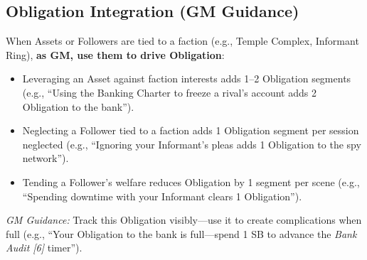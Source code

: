 \subsection{Obligation Integration (GM Guidance)}
\label{sec:obligation-integration}
When Assets or Followers are tied to a faction (e.g., Temple Complex, Informant Ring), \textbf{as GM, use them to drive Obligation}:  
\begin{itemize}
  \item Leveraging an Asset against faction interests adds 1--2 Obligation segments (e.g., ``Using the Banking Charter to freeze a rival's account adds 2 Obligation to the bank'').  
  \item Neglecting a Follower tied to a faction adds 1 Obligation segment per session neglected (e.g., ``Ignoring your Informant's pleas adds 1 Obligation to the spy network'').  
  \item Tending a Follower's welfare reduces Obligation by 1 segment per scene (e.g., ``Spending downtime with your Informant clears 1 Obligation'').  
\end{itemize}
\textit{GM Guidance:} Track this Obligation visibly---use it to create complications when full (e.g., ``Your Obligation to the bank is full---spend 1 SB to advance the \emph{Bank Audit [6]} timer'').  


